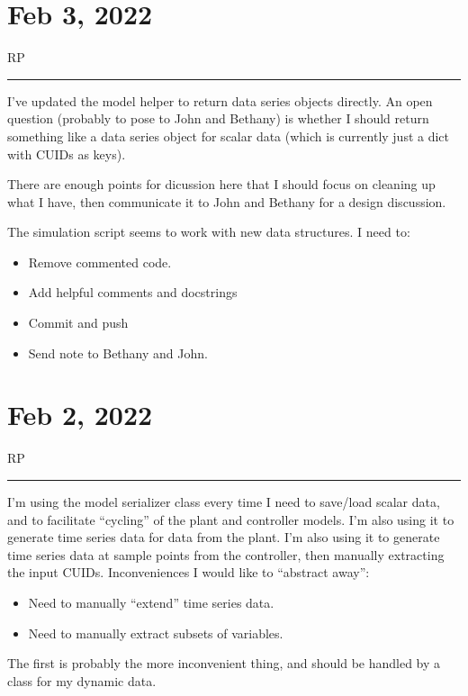 \documentclass{article}
\newcommand{\RP}{\vspace{0.5cm}RP\vspace{0.2cm}\hrule\vspace{0.2cm}}
\begin{document}
\section{Feb 3, 2022}

\RP
I've updated the model helper to return data series objects directly.
An open question (probably to pose to John and Bethany) is whether
I should return something like a data series object for scalar
data (which is currently just a dict with CUIDs as keys).

There are enough points for dicussion here that I should focus on cleaning up
what I have, then communicate it to John and Bethany for a design discussion.

\medskip

The simulation script seems to work with new data structures.
I need to:
\begin{itemize}
  \item Remove commented code.
  \item Add helpful comments and docstrings
  \item Commit and push
  \item Send note to Bethany and John.
\end{itemize}

\section{Feb 2, 2022}

\RP
I'm using the model serializer class every time I need to save/load scalar data,
and to facilitate ``cycling'' of the plant and controller models.
I'm also using it to generate time series data for data from the plant.
I'm also using it to generate time series data at sample points from the
controller, then manually extracting the input CUIDs.
Inconveniences I would like to ``abstract away'':
\begin{itemize}
  \item Need to manually ``extend'' time series data.
  \item Need to manually extract subsets of variables.
\end{itemize}
The first is probably the more inconvenient thing, and should be handled by
a class for my dynamic data.
\end{document}

